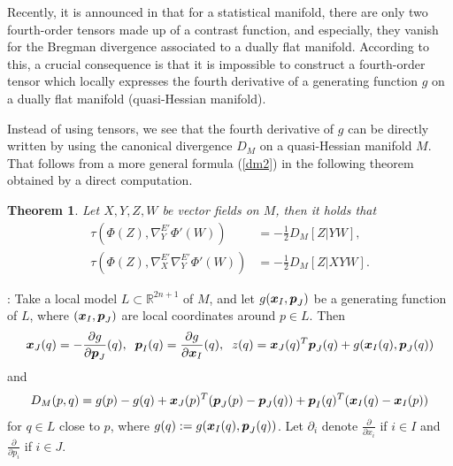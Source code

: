 \documentclass[10pt]{amsart}
\def\proof{\noindent {\sl Proof} :\;  }
\newcommand{\R}{\mathbb{R}}
\def\proof{\noindent {\sl Proof} :\;  }
\def\rd{\partial}
\def\bx{\mbox{\boldmath $x$}}
\def\bp{\mbox{\boldmath $p$}}
\newtheorem{thm}{\bf Theorem}[section]
\begin{document}
Recently, it is announced in \cite{CMP} that for a statistical manifold,
there are only two fourth-order tensors made up of a contrast function, and especially, they vanish for the Bregman divergence associated to a dually flat manifold.
According to this, a crucial consequence is that 
it is impossible to construct a fourth-order tensor which locally expresses the fourth derivative of a generating function $g$ on a dually flat manifold (quasi-Hessian manifold).


Instead of using tensors, we see that the fourth derivative of $g$ can be directly written by using the canonical divergence $D_M$ on a quasi-Hessian manifold $M$. 
That follows from a more general formula (\ref{dm2}) in the following theorem obtained by a direct computation. 
\begin{thm}\label{equ_div}
Let $X, Y, Z, W$ be vector fields on $M$, then it holds that 
\begin{align}
\tau(\Phi(Z), \nabla^{E'}_Y\Phi'(W)) &= -\frac{1}{2}D_M[Z|YW],\label{dm1}\\
\tau(\Phi(Z), \nabla^{E'}_X\nabla^{E'}_Y\Phi'(W)) &= -\frac{1}{2}D_M[Z|XYW]\label{dm2}.
\end{align}
\end{thm}
\proof 
Take a local model $L\subset\R^{2n+1}$ of $M$, and let $g(\bx_I, \bp_J)$ be a generating function of $L$, where $(\bx_I, \bp_J)$ are local coordinates around $p\in L$. Then 
$$\bx_J(q)=-\frac{\rd g}{\rd \bp_J}(q), \;\; \bp_I(q)=\frac{\rd g}{\rd \bx_I}(q), \;\; z(q)=\bx_J(q)^T\bp_J(q)+g(\bx_I(q), \bp_J(q))$$ 
and 
\begin{align}\label{D}
D_M(p,q) = g(p) - g(q) + \bx_J(p)^T(\bp_J(p)-\bp_J(q)) + \bp_I(q)^T(\bx_I(q)-\bx_I(p))
\end{align}
for $q\in L$ close to $p$, where $g(q):=g(\bx_I(q), \bp_J(q))$.
Let $\rd_i$ denote $\frac{\rd}{\rd x_i}$ if $i\in I$ and $\frac{\rd}{\rd p_i}$ if $i\in J$.
\end{document}
